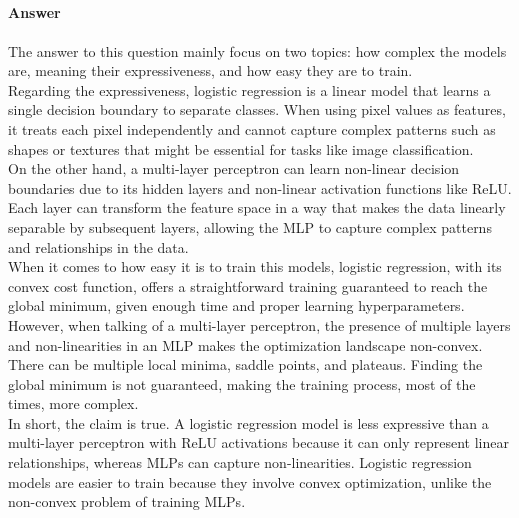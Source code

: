 \documentclass{article}
\begin{document}
\subsection{}

\subsubsection{}

\paragraph{Answer}
The answer to this question mainly focus on two topics: how complex the models are, meaning their expressiveness, and how easy they are to train. \\
Regarding the expressiveness, logistic regression is a linear model that learns a single decision boundary to separate classes. 
When using pixel values as features, it treats each pixel independently and cannot capture complex patterns such as shapes or textures 
that might be essential for tasks like image classification.\\ 
On the other hand, a multi-layer perceptron can learn non-linear decision boundaries due to its hidden layers and non-linear activation functions like ReLU. 
Each layer can transform the feature space in a way that makes the data linearly separable by subsequent layers, allowing the MLP to capture 
complex patterns and relationships in the data.\\
When it comes to how easy it is to train this models, logistic regression, with its convex cost function, offers a straightforward training guaranteed 
to reach the global minimum, given enough time and proper learning hyperparameters. 
However, when talking of a multi-layer perceptron, the presence of multiple layers and non-linearities in an MLP makes the optimization landscape non-convex. 
There can be multiple local minima, saddle points, and plateaus. Finding the global minimum is not guaranteed, making the training process, 
most of the times, more complex.\\
In short, the claim is true. A logistic regression model is less expressive than a multi-layer perceptron with ReLU activations because it can only 
represent linear relationships, whereas MLPs can capture non-linearities. Logistic regression models are easier to train because they involve 
convex optimization, unlike the non-convex problem of training MLPs.

\subsubsection{}
\end{document}
